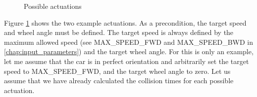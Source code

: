 \begin{figure}[!ht]
    \centering
    \caption{Possible actuations}
    \label{possible_actuations}
\end{figure}

Figure \ref{possible_actuations} shows the two example actuations. As a precondition, the target speed and wheel angle must be defined. The target speed is always defined by the maximum allowed speed (see MAX\_SPEED\_FWD and MAX\_SPEED\_BWD in \ref{chap:input_parameters}) and the target wheel angle. For this is only an example, let me assume that the car is in perfect orientation and arbitrarily set the target speed to MAX\_SPEED\_FWD, and the target wheel angle to zero. Let us assume that we have already calculated the collision times for each possible actuation.

